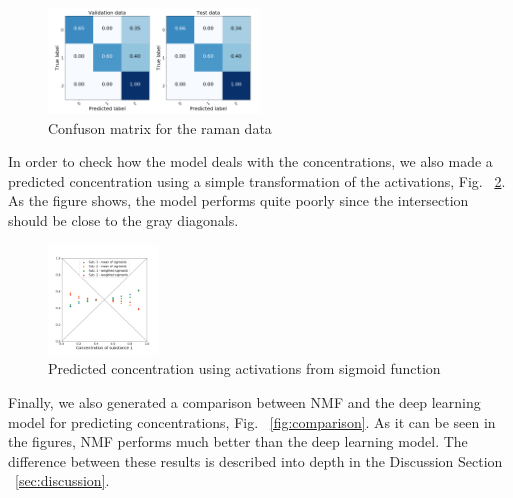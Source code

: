 \documentclass{article}
\begin{document}
\begin{figure}[H]
  \centering
  \includegraphics[width=0.5\textwidth]{raman_sim_3_conf_matrix13_2.png}
  \caption{Confuson matrix for the raman data}
  \label{fig:confusion}
\end{figure}
%
In order to check how the model deals with the concentrations, we also made a predicted concentration using a simple transformation of the activations, Fig. ~\ref{fig:conc_sigmoids}. As the figure shows, the model performs quite poorly since the intersection should be close to the gray diagonals. %
\begin{figure}[H]
	\centering
	\includegraphics[width=0.26\textwidth]{DNN_pred_conc_sigmoid_2.png} 
	\caption{Predicted concentration using activations from sigmoid function}
	\label{fig:conc_sigmoids}
\end{figure}
%
Finally, we also generated a comparison between NMF and the deep learning model for predicting concentrations, Fig. ~\ref{fig:comparison}. As it can be seen in the figures, NMF performs much better than the deep learning model. The difference between these results is described into depth in the Discussion Section ~\ref{sec:discussion}.
\end{document}
